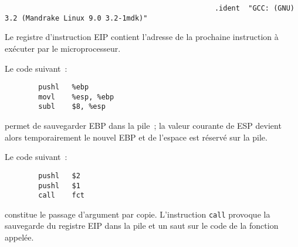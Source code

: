\begin{frame}
\begin{verbatim}
                                                  .ident  "GCC: (GNU) 3.2 (Mandrake Linux 9.0 3.2-1mdk)"
\end{verbatim}
  Le   registre  d'instruction     EIP   contient l'adresse    de   la
  prochaine instruction \`a ex\'ecuter par le microprocesseur.
  \par
  Le code suivant~:
\begin{verbatim}
        pushl   %ebp
        movl    %esp, %ebp
        subl    $8, %esp
\end{verbatim}
  permet de sauvegarder EBP  dans la pile~;  la valeur courante de ESP
  devient  alors temporairement  le   nouvel EBP  et de  l'espace  est
  r\'eserv\'e sur la pile.
  \par
  Le code suivant~:
\begin{verbatim}
        pushl   $2
        pushl   $1
        call    fct
\end{verbatim}
  constitue  le    passage   d'argument  par   copie.    L'instruction
  \texttt{call} provoque la sauvegarde du registre EIP dans la pile et
  un saut sur le code de la fonction appel\'ee.
\end{frame}
